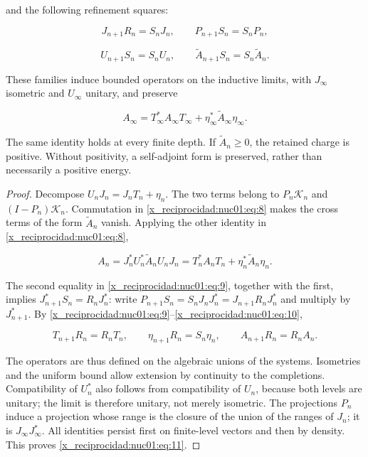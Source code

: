 and the following refinement squares:

\begin{equation}
J_{n+1}R_n=S_nJ_n,\qquad
P_{n+1}S_n=S_nP_n,
\label{x_reciprocidad:nuc01:eq:9}
\end{equation}

\begin{equation}
U_{n+1}S_n=S_nU_n,\qquad
\widetilde A_{n+1}S_n=S_n\widetilde A_n.
\label{x_reciprocidad:nuc01:eq:10}
\end{equation}

\begin{theorem}
These families induce bounded operators on the inductive limits, with \(J_\infty\) isometric and \(U_\infty\) unitary, and preserve

\begin{equation}
A_\infty
=T_\infty^*A_\infty T_\infty
 +\eta_\infty^*\widetilde A_\infty\eta_\infty.
\label{x_reciprocidad:nuc01:eq:11}
\end{equation}

The same identity holds at every finite depth. If \(\widetilde A_n\geq0\), the retained charge is positive. Without positivity, a self-adjoint form is preserved, rather than necessarily a positive energy.
\end{theorem}

\begin{proof}
Decompose \(U_nJ_n=J_nT_n+\eta_n\). The two terms belong to \(P_n\mathscr K_n\) and \((I-P_n)\mathscr K_n\). Commutation in \eqref{x_reciprocidad:nuc01:eq:8} makes the cross terms of the form \(\widetilde A_n\) vanish. Applying the other identity in \eqref{x_reciprocidad:nuc01:eq:8},

\[
A_n=J_n^*U_n^*\widetilde A_nU_nJ_n
=T_n^*A_nT_n+\eta_n^*\widetilde A_n\eta_n.
\]

The second equality in \eqref{x_reciprocidad:nuc01:eq:9}, together with the first, implies
\(J_{n+1}^*S_n=R_nJ_n^*\): write
\(P_{n+1}S_n=S_nJ_nJ_n^*=J_{n+1}R_nJ_n^*\) and multiply by \(J_{n+1}^*\).
By \eqref{x_reciprocidad:nuc01:eq:9}–\eqref{x_reciprocidad:nuc01:eq:10},

\[
T_{n+1}R_n=R_nT_n,\qquad
\eta_{n+1}R_n=S_n\eta_n,\qquad
A_{n+1}R_n=R_nA_n.
\]

The operators are thus defined on the algebraic unions of the systems. Isometries and the uniform bound allow extension by continuity to the completions. Compatibility of \(U_n^*\) also follows from compatibility of \(U_n\), because both levels are unitary; the limit is therefore unitary, not merely isometric. The projections \(P_n\) induce a projection whose range is the closure of the union of the ranges of \(J_n\); it is \(J_\infty J_\infty^*\). All identities persist first on finite-level vectors and then by density. This proves \eqref{x_reciprocidad:nuc01:eq:11}.
\end{proof}

